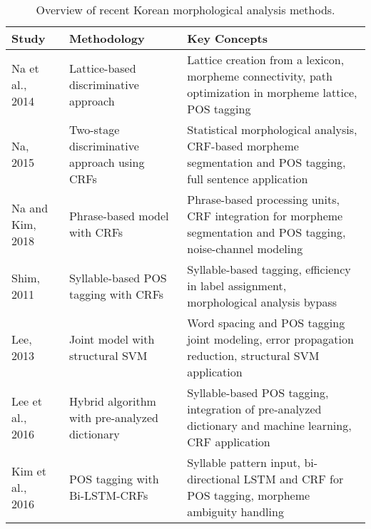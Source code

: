 \documentclass[AMS,STIX2COL]{WileyNJD-v2}
\begin{document}
    \begin{table}[ht]
        \centering
        \footnotesize %
        \caption{Overview of recent Korean morphological analysis methods.}
        \label{tab:overview-of-recent-korean-morphological-analysis-methods}
        \begin{tabular}{|p{10mm}|p{24mm}|p{40mm}|}
            \hline
            \textbf{Study}                        & \textbf{Methodology}                                   & \textbf{Key Concepts}                                                                                            \\
            \hline
            Na et al., 2014~\cite{NaSH2014}       & Lattice-based discriminative approach                  & Lattice creation from a lexicon, morpheme connectivity, path optimization in morpheme lattice, POS tagging       \\
            \hline
            Na, 2015~\cite{NaSH2015}              & Two-stage discriminative approach using CRFs           & Statistical morphological analysis, CRF-based morpheme segmentation and POS tagging, full sentence application   \\
            \hline
            Na and Kim, 2018~\cite{NaSH2018}      & Phrase-based model with CRFs                           & Phrase-based processing units, CRF integration for morpheme segmentation and POS tagging, noise-channel modeling \\
            \hline
            Shim, 2011~\cite{ShimKS2011}          & Syllable-based POS tagging with CRFs                   & Syllable-based tagging, efficiency in label assignment, morphological analysis bypass                            \\
            \hline
            Lee, 2013~\cite{LeeCK2013}            & Joint model with structural SVM                        & Word spacing and POS tagging joint modeling, error propagation reduction, structural SVM application             \\
            \hline
            Lee et al., 2016~\cite{LeeCH2016}     & Hybrid algorithm with pre-analyzed dictionary          & Syllable-based POS tagging, integration of pre-analyzed dictionary and machine learning, CRF application         \\
            \hline
            Kim et al., 2016~\cite{KimHM2016}     & POS tagging with Bi-LSTM-CRFs                          & Syllable pattern input, bi-directional LSTM and CRF for POS tagging, morpheme ambiguity handling                 \\

\end{tabular}
\end{table}
\end{document}
